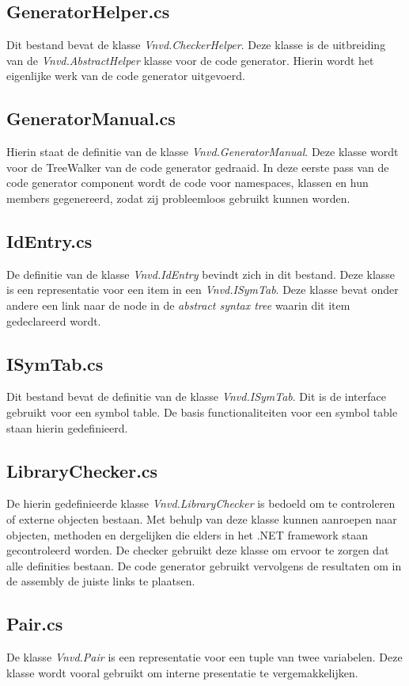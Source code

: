 \subsection{GeneratorHelper.cs}
Dit bestand bevat de klasse \textit{Vnvd.CheckerHelper}. Deze klasse is de uitbreiding van de \textit{Vnvd.AbstractHelper} klasse voor de code generator. Hierin wordt het eigenlijke werk van de code generator uitgevoerd.

\subsection{GeneratorManual.cs}
Hierin staat de definitie van de klasse \textit{Vnvd.GeneratorManual}. Deze klasse wordt voor de TreeWalker van de code generator gedraaid. In deze eerste pass van de code generator component wordt de code voor namespaces, klassen en hun members gegenereerd, zodat zij probleemloos gebruikt kunnen worden.

\subsection{IdEntry.cs}
De definitie van de klasse \textit{Vnvd.IdEntry} bevindt zich in dit bestand. Deze klasse is een representatie voor een item in een \textit{Vnvd.ISymTab}. Deze klasse bevat onder andere een link naar de node in de \textit{abstract syntax tree} waarin dit item gedeclareerd wordt.

\subsection{ISymTab.cs}
Dit bestand bevat de definitie van de klasse \textit{Vnvd.ISymTab}. Dit is de interface gebruikt voor een symbol table. De basis functionaliteiten voor een symbol table staan hierin gedefinieerd.

\subsection{LibraryChecker.cs}
De hierin gedefinieerde klasse \textit{Vnvd.LibraryChecker} is bedoeld om te controleren of externe objecten bestaan. Met behulp van deze klasse kunnen aanroepen naar objecten, methoden en dergelijken die elders in het .NET framework staan gecontroleerd worden. De checker gebruikt deze klasse om ervoor te zorgen dat alle definities bestaan. De code generator gebruikt vervolgens de resultaten om in de assembly de juiste links te plaatsen.

\subsection{Pair.cs}
De klasse \textit{Vnvd.Pair} is een representatie voor een tuple van twee variabelen. Deze klasse wordt vooral gebruikt om interne presentatie te vergemakkelijken.

